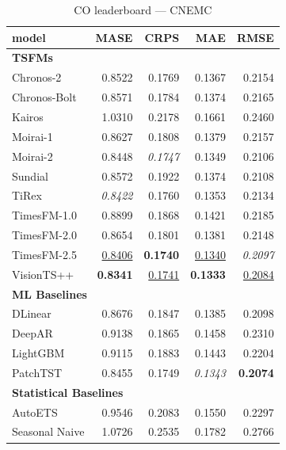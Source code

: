 \begin{table}[H]
\caption{CO leaderboard --- CNEMC}
\centering
\begin{small}
\begin{tabular}{lrrrr}
\toprule
model & MASE & CRPS & MAE & RMSE \\
\midrule
\multicolumn{5}{l}{\textbf{TSFMs}} \\
Chronos-2 & 0.8522 & 0.1769 & 0.1367 & 0.2154 \\
Chronos-Bolt & 0.8571 & 0.1784 & 0.1374 & 0.2165 \\
Kairos & 1.0310 & 0.2178 & 0.1661 & 0.2460 \\
Moirai-1 & 0.8627 & 0.1808 & 0.1379 & 0.2157 \\
Moirai-2 & 0.8448 & \textit{0.1747} & 0.1349 & 0.2106 \\
Sundial & 0.8572 & 0.1922 & 0.1374 & 0.2108 \\
TiRex & \textit{0.8422} & 0.1760 & 0.1353 & 0.2134 \\
TimesFM-1.0 & 0.8899 & 0.1868 & 0.1421 & 0.2185 \\
TimesFM-2.0 & 0.8654 & 0.1801 & 0.1381 & 0.2148 \\
TimesFM-2.5 & \underline{0.8406} & \textbf{0.1740} & \underline{0.1340} & \textit{0.2097} \\
VisionTS++ & \textbf{0.8341} & \underline{0.1741} & \textbf{0.1333} & \underline{0.2084} \\
\midrule
\multicolumn{5}{l}{\textbf{ML Baselines}} \\
DLinear & 0.8676 & 0.1847 & 0.1385 & 0.2098 \\
DeepAR & 0.9138 & 0.1865 & 0.1458 & 0.2310 \\
LightGBM & 0.9115 & 0.1883 & 0.1443 & 0.2204 \\
PatchTST & 0.8455 & 0.1749 & \textit{0.1343} & \textbf{0.2074} \\
\midrule
\multicolumn{5}{l}{\textbf{Statistical Baselines}} \\
AutoETS & 0.9546 & 0.2083 & 0.1550 & 0.2297 \\
Seasonal Naive & 1.0726 & 0.2535 & 0.1782 & 0.2766 \\
\bottomrule
\end{tabular}
\end{small}
\end{table}